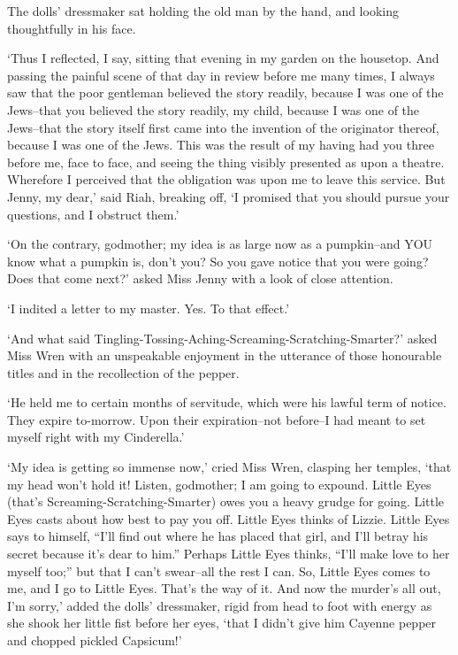 The dolls’ dressmaker sat holding the old man by the hand, and looking
thoughtfully in his face.

‘Thus I reflected, I say, sitting that evening in my garden on the
housetop. And passing the painful scene of that day in review before
me many times, I always saw that the poor gentleman believed the story
readily, because I was one of the Jews--that you believed the story
readily, my child, because I was one of the Jews--that the story itself
first came into the invention of the originator thereof, because I was
one of the Jews. This was the result of my having had you three before
me, face to face, and seeing the thing visibly presented as upon a
theatre. Wherefore I perceived that the obligation was upon me to leave
this service. But Jenny, my dear,’ said Riah, breaking off, ‘I promised
that you should pursue your questions, and I obstruct them.’

‘On the contrary, godmother; my idea is as large now as a pumpkin--and
YOU know what a pumpkin is, don’t you? So you gave notice that you
were going? Does that come next?’ asked Miss Jenny with a look of close
attention.

‘I indited a letter to my master. Yes. To that effect.’

‘And what said Tingling-Tossing-Aching-Screaming-Scratching-Smarter?’
asked Miss Wren with an unspeakable enjoyment in the utterance of those
honourable titles and in the recollection of the pepper.

‘He held me to certain months of servitude, which were his lawful term
of notice. They expire to-morrow. Upon their expiration--not before--I
had meant to set myself right with my Cinderella.’

‘My idea is getting so immense now,’ cried Miss Wren, clasping her
temples, ‘that my head won’t hold it! Listen, godmother; I am going to
expound. Little Eyes (that’s Screaming-Scratching-Smarter) owes you a
heavy grudge for going. Little Eyes casts about how best to pay you off.
Little Eyes thinks of Lizzie. Little Eyes says to himself, “I’ll find
out where he has placed that girl, and I’ll betray his secret because
it’s dear to him.” Perhaps Little Eyes thinks, “I’ll make love to her
myself too;” but that I can’t swear--all the rest I can. So, Little Eyes
comes to me, and I go to Little Eyes. That’s the way of it. And now the
murder’s all out, I’m sorry,’ added the dolls’ dressmaker, rigid from
head to foot with energy as she shook her little fist before her eyes,
‘that I didn’t give him Cayenne pepper and chopped pickled Capsicum!’

